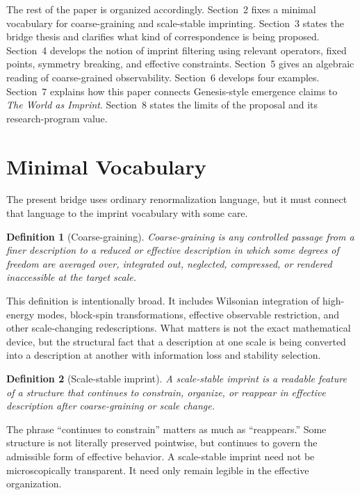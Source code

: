 \documentclass[12pt]{article}
\newtheorem{definition}{Definition}[section]
\begin{document}
The rest of the paper is organized accordingly. Section~2 fixes a minimal vocabulary for coarse-graining and scale-stable imprinting. Section~3 states the bridge thesis and clarifies what kind of correspondence is being proposed. Section~4 develops the notion of imprint filtering using relevant operators, fixed points, symmetry breaking, and effective constraints. Section~5 gives an algebraic reading of coarse-grained observability. Section~6 develops four examples. Section~7 explains how this paper connects Genesis-style emergence claims to \emph{The World as Imprint}. Section~8 states the limits of the proposal and its research-program value.

\section{Minimal Vocabulary}

The present bridge uses ordinary renormalization language, but it must connect that language to the imprint vocabulary with some care.

\begin{definition}[Coarse-graining]
\emph{Coarse-graining} is any controlled passage from a finer description to a reduced or effective description in which some degrees of freedom are averaged over, integrated out, neglected, compressed, or rendered inaccessible at the target scale.
\end{definition}

This definition is intentionally broad. It includes Wilsonian integration of high-energy modes, block-spin transformations, effective observable restriction, and other scale-changing redescriptions. What matters is not the exact mathematical device, but the structural fact that a description at one scale is being converted into a description at another with information loss and stability selection.

\begin{definition}[Scale-stable imprint]
A \emph{scale-stable imprint} is a readable feature of a structure that continues to constrain, organize, or reappear in effective description after coarse-graining or scale change.
\end{definition}

The phrase ``continues to constrain'' matters as much as ``reappears.'' Some structure is not literally preserved pointwise, but continues to govern the admissible form of effective behavior. A scale-stable imprint need not be microscopically transparent. It need only remain legible in the effective organization.
\end{document}
